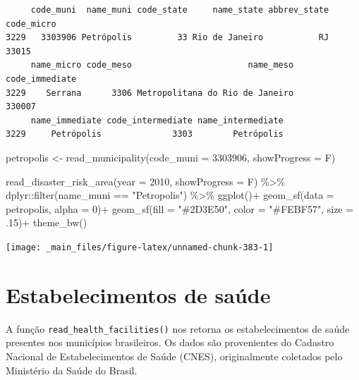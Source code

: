 \documentclass[
  brazilian,
]{book}
\newenvironment{Shaded}{\begin{snugshade}}{\end{snugshade}}
\newcommand{\AttributeTok}[1]{\textcolor[rgb]{0.77,0.63,0.00}{#1}}
\newcommand{\DecValTok}[1]{\textcolor[rgb]{0.00,0.00,0.81}{#1}}
\newcommand{\FunctionTok}[1]{\textcolor[rgb]{0.00,0.00,0.00}{#1}}
\newcommand{\NormalTok}[1]{#1}
\newcommand{\OtherTok}[1]{\textcolor[rgb]{0.56,0.35,0.01}{#1}}
\newcommand{\SpecialCharTok}[1]{\textcolor[rgb]{0.00,0.00,0.00}{#1}}
\newcommand{\StringTok}[1]{\textcolor[rgb]{0.31,0.60,0.02}{#1}}
\begin{document}
\begin{verbatim}
     code_muni  name_muni code_state     name_state abbrev_state code_micro
3229   3303906 Petrópolis         33 Rio de Janeiro           RJ      33015
     name_micro code_meso                       name_meso code_immediate
3229    Serrana      3306 Metropolitana do Rio de Janeiro         330007
     name_immediate code_intermediate name_intermediate
3229     Petrópolis              3303        Petrópolis
\end{verbatim}

\begin{Shaded}
\begin{Highlighting}[]
\NormalTok{petropolis }\OtherTok{\textless{}{-}} \FunctionTok{read\_municipality}\NormalTok{(}\AttributeTok{code\_muni =} \DecValTok{3303906}\NormalTok{,}
                                \AttributeTok{showProgress =}\NormalTok{ F)}

\FunctionTok{read\_disaster\_risk\_area}\NormalTok{(}\AttributeTok{year =} \DecValTok{2010}\NormalTok{,}
                        \AttributeTok{showProgress =}\NormalTok{ F) }\SpecialCharTok{\%\textgreater{}\%}
\NormalTok{  dplyr}\SpecialCharTok{::}\FunctionTok{filter}\NormalTok{(name\_muni }\SpecialCharTok{==} \StringTok{"Petropolis"}\NormalTok{) }\SpecialCharTok{\%\textgreater{}\%}
  \FunctionTok{ggplot}\NormalTok{()}\SpecialCharTok{+}
  \FunctionTok{geom\_sf}\NormalTok{(}\AttributeTok{data =}\NormalTok{ petropolis, }\AttributeTok{alpha =} \DecValTok{0}\NormalTok{)}\SpecialCharTok{+}
  \FunctionTok{geom\_sf}\NormalTok{(}\AttributeTok{fill =} \StringTok{"\#2D3E50"}\NormalTok{, }\AttributeTok{color =} \StringTok{"\#FEBF57"}\NormalTok{, }\AttributeTok{size =}\NormalTok{ .}\DecValTok{15}\NormalTok{)}\SpecialCharTok{+}
  \FunctionTok{theme\_bw}\NormalTok{()}
\end{Highlighting}
\end{Shaded}

\begin{center}\texttt{[image: \_main\_files/figure-latex/unnamed-chunk-383-1]} \end{center}

\hypertarget{estabelecimentos-de-sauxfade}{%
\section{Estabelecimentos de saúde}\label{estabelecimentos-de-sauxfade}}

A função \texttt{read\_health\_facilities()} nos retorna os estabelecimentos de saúde presentes nos municípios brasileiros. Os dados são provenientes do Cadastro Nacional de Estabelecimentos de Saúde (CNES), originalmente coletados pelo Ministério da Saúde do Brasil.
\end{document}
